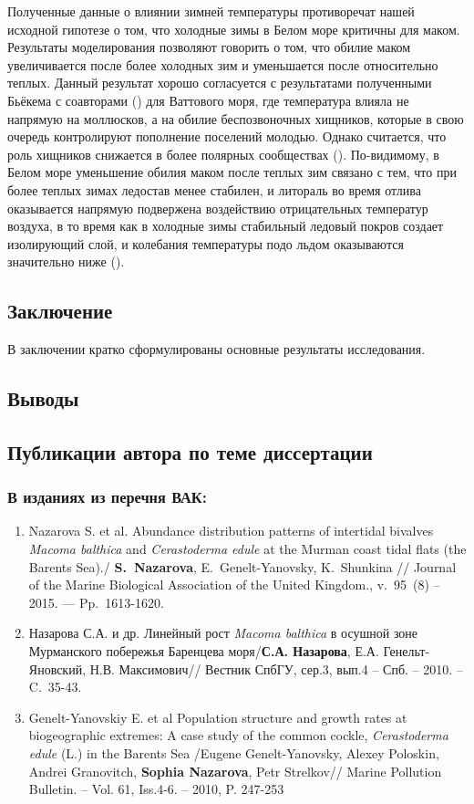 {Полученные данные о влиянии зимней температуры противоречат нашей исходной гипотезе о том, что холодные зимы в Белом море критичны для маком. 
Результаты моделирования позволяют говорить о том, что обилие маком увеличивается после более холодных зим и уменьшается после относительно теплых. 
Данный результат хорошо согласуется с результатами полученными Бьёкема с соавторами (\cite{Beukema_et_al_1998, Beukema_et_al_2009}) для Ваттового моря, где температура влияла не напрямую на моллюсков, а на обилие беспозвоночных хищников, которые в свою очередь контролируют пополнение поселений молодью.  
Однако считается, что роль хищников снижается в более полярных сообществах (\cite{Pianka_1966, Freestone_et_al_2011}). 
По-видимому, в Белом море уменьшение обилия маком после теплых зим связано с тем, что при более теплых зимах ледостав менее стабилен, и литораль во время отлива оказывается напрямую подвержена воздействию отрицательных температур воздуха, в то время как в холодные зимы стабильный ледовый покров создает изолирующий слой, и колебания температуры подо льдом оказываются значительно ниже (\cite{Kuznecov_1960}).
\subsection*{Заключение}
В заключении кратко сформулированы основные результаты исследования.

\subsection*{Выводы}


\begin{small}
\section*{Публикации автора по теме диссертации}
\subsubsection*{В изданиях из перечня ВАК:}
\begin{enumerate}
\item  Nazarova S. et al. Abundance distribution patterns of intertidal bivalves \textit{Macoma balthica} and \textit{Cerastoderma edule} at the Murman coast tidal flats (the Barents Sea)./ \textbf{S.~Nazarova}, E.~Genelt-Yanovsky, K.~Shunkina // Journal of the Marine Biological Association of the United Kingdom., v.~95~(8) -- 2015. — Pp.~1613-1620.
\item Назарова С.А. и др. Линейный рост \textit{Macoma balthica} в осушной зоне Мурманского побережья Баренцева моря/\textbf{С.А. Назарова}, Е.А.  Генельт-Яновский,  Н.В. Максимович// Вестник СпбГУ, сер.3, вып.4 -- Спб. -- 2010. -- C.~35-43.
\item Genelt-Yanovskiy E. et al Population structure and growth rates at biogeographic extremes: A case study of the common cockle, \textit{Cerastoderma edule} (L.) in the Barents Sea /Eugene Genelt-Yanovsky, Alexey Poloskin, Andrei Granovitch, \textbf{Sophia Nazarova}, Petr Strelkov// Marine Pollution Bulletin. -- Vol. 61, Iss.4-6. -- 2010, P. 247-253 
\end{enumerate}


\end{small}}
